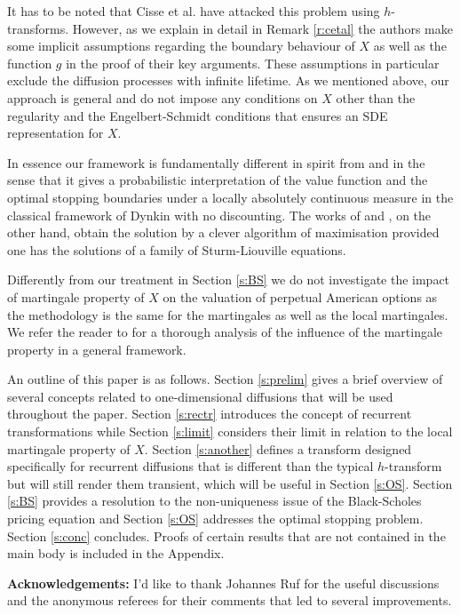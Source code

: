 \documentclass[11pt,reqno]{amsart}
\numberwithin{equation}{section}
\begin{document}
It has to be noted that Cisse et al. \cite{CPT} have attacked this problem using $h$-transforms. However, as we explain in detail in Remark \ref{r:cetal} the authors make some implicit assumptions regarding the boundary behaviour of $X$ as well as the function $g$ in the proof of their key arguments. These assumptions in particular exclude the diffusion processes with infinite lifetime. As we mentioned above, our approach is general and do not impose any conditions on $X$ other than the regularity and the Engelbert-Schmidt conditions that ensures an SDE representation for $X$.

In essence our framework is fundamentally different in spirit from \cite{CPT} and \cite{BL} in the sense that it gives a probabilistic interpretation of the value function and the optimal stopping boundaries under a locally absolutely continuous measure in the classical framework of Dynkin \cite{Dyn} with no discounting. The works of \cite{CPT} and \cite{BL}, on the other hand, obtain the solution by a clever algorithm of maximisation provided one has the solutions of a family of Sturm-Liouville equations.


Differently from our treatment in Section \ref{s:BS} we do not investigate the impact of martingale property of $X$ on the valuation of perpetual American options as the methodology is the same for the martingales as well as the local martingales. We refer the reader to \cite{BKX2} for a thorough analysis of the influence of the martingale property in a general framework. 

An outline of this paper is as follows. Section \ref{s:prelim} gives a brief overview of several concepts related to one-dimensional diffusions that will be used throughout the paper. Section \ref{s:rectr} introduces the concept of recurrent transformations while Section \ref{s:limit} considers their limit in relation to the local martingale property of $X$. Section \ref{s:another} defines a transform designed specifically  for recurrent diffusions that is different than the typical $h$-transform but  will still render them transient, which will be useful in Section \ref{s:OS}.  Section \ref{s:BS} provides a resolution to the non-uniqueness issue of the Black-Scholes pricing equation and Section \ref{s:OS} addresses the optimal stopping problem. Section \ref{s:conc} concludes.  Proofs of certain results that are not contained in the main body is included in the Appendix. 

{\bf Acknowledgements:} I'd like to thank Johannes Ruf for the useful discussions  and the anonymous referees for their comments that led to several improvements.
\end{document}
